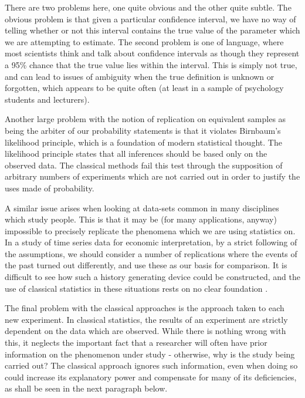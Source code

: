 There are two problems here, one quite obvious and the other quite subtle. The obvious problem is that given a particular confidence interval, we have no way of telling whether or not this interval contains the true value of the parameter which we are attempting to estimate\cite{gill2002bayesian}. The second problem is one of language, where most scientists think and talk about confidence intervals as though they represent a 95\% chance that the true value lies within the interval. This is simply not true, and can lead to issues of ambiguity when the true definition is unknown or forgotten, which appears to be quite often \cite{falk1995significance} (at least in a sample of psychology students and lecturers).  

Another large problem with the notion of replication on equivalent samples as being the arbiter of our probability statements is that it violates Birnbaum's likelihood principle, which is a foundation of modern statistical thought\cite{gill2002bayesian, gelman2004bayesian}. The likelihood principle states that all inferences should be based only on the observed data. The classical methods fail this test through the supposition of arbitrary numbers of experiments which are not carried out in order to justify the uses made of probability. 

A similar issue arises when looking at data-sets common in many disciplines which study people. This is that it may be (for many applications, anyway) impossible to precisely replicate the phenomena which we are using statistics on. In a study of time series data for economic interpretation, by a strict following of the assumptions, we should consider a number of replications where the events of the past turned out differently, and use these as our basis for comparison. It is difficult to see how such a history generating device could be constructed, and the use of classical statistics in these situations rests on no clear foundation \cite{gill2002bayesian}. 

The final problem with the classical approaches is the approach taken to each new experiment. In classical statistics, the results of an experiment are strictly dependent on the data which are observed. While there is nothing wrong with this, it neglects the important fact that a researcher will often have prior information on the phenomenon under study - otherwise, why is the study being carried out?\cite{gill2002bayesian, gelman2004bayesian} The classical approach ignores such information, even when doing so could increase its explanatory power and compensate for many of its deficiencies, as shall be seen in the next paragraph below. 


